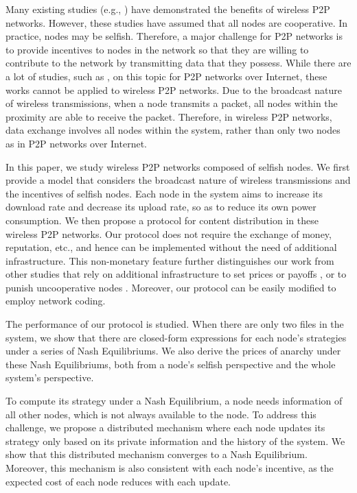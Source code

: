\documentclass[11pt, conference]{IEEEtran}
\begin{document}
Many existing studies (e.g., \cite{HH04,MN11, JZ08}) have demonstrated the benefits of wireless P2P networks. However, these studies have assumed that all nodes are cooperative. In practice, nodes may be selfish. Therefore, a major challenge for P2P networks is to provide incentives to nodes in the network so that they are willing to contribute to the network by transmitting data that they possess. While there are a lot of studies, such as \cite{CA11,SL09, VM10}, on this topic for P2P networks over Internet, these works cannot be applied to wireless P2P networks. Due to the broadcast nature of wireless transmissions, when a node transmits a packet, all nodes within the proximity are able to receive the packet. Therefore, in wireless P2P networks, data exchange involves all nodes within the system, rather than only two nodes as in P2P networks over Internet.

In this paper, we study wireless P2P networks composed of selfish nodes. We first provide a model that considers the broadcast nature of wireless transmissions and the incentives of selfish nodes. Each node in the system aims to increase its download rate and decrease its upload rate, so as to reduce its own power consumption. We then propose a protocol for content distribution in these wireless P2P networks. Our protocol does not require the exchange of money, reputation, etc., and hence can be implemented without the need of additional infrastructure. This non-monetary feature further distinguishes our work from other studies that rely on additional infrastructure to set prices or payoffs \cite{JP10, VM10, ZH09}, or to punish uncooperative nodes \cite{WL11}. Moreover, our protocol can be easily modified to employ network coding. 

The performance of our protocol is studied. When there are only two files in the system, we show that there are closed-form expressions for each node's strategies under a series of Nash Equilibriums. We also derive the prices of anarchy under these Nash Equilibriums, both from a node's selfish perspective and the whole system's perspective.

To compute its strategy under a Nash Equilibrium, a node needs information of all other nodes, which is not always available to the node. To address this challenge, we propose a distributed mechanism where each node updates its strategy only based on its private information and the history of the system. We show that this distributed mechanism converges to a Nash Equilibrium. Moreover, this mechanism is also consistent with each node's incentive, as the expected cost of each node reduces with each update.
\end{document}
